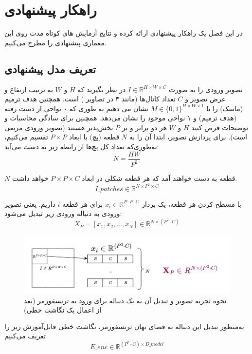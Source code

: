 
\chapter{راهکار پیشنهادی}

در این فصل یک راهکار پیشنهادی ارائه کرده و نتایج آزمایش های کوتاه مدت روی این معماری پیشنهادی را مطرح می‌کنیم.

\section{تعریف مدل پیشنهادی}

تصویر ورودی را به صورت $I \in \mathbb{R}^{H \times W \times C}$ در نظر بگیرید که $H$ و $W$ به ترتیب ارتفاع و عرض تصویر و $C$ تعداد کانال‌ها (مانند ۳ در تصاویر ) است. همچنین هدف ترمیم (ماسک) را با
$M \in \{0,1\}^{H \times W \times 1} $
نشان می دهیم به طوری که ۰ نواحی از دست رفته (هدف ترمیم) و ۱ نواحی موجود را نشان می‌دهد. همچنین برای سادگی محاسبات و توضیحات فرض کنید $H$ و‌ $W$ هر دو برابر و بر $P$ بخش‌پذیر هستند (تصویر ورودی مربعی است). برای پردازش تصویر، ابتدا آن را به $N$ قطعه (پچ) با ابعاد $P \times P$ تقسیم می‌کنیم، به‌طوری‌که تعداد کل پچ‌ها از رابطه زیر به دست می‌آید:
$$
N = \frac{HW}{P^2}
$$

$N$
قطعه به دست خواهند آمد که هر قطعه شکلی در ابعاد ${P \times P \times C}$ خواهد داشت.
$$
I\_{patches} \in \mathbb{R}^{N \times P^2 \times C}
$$

با مسطح کردن هر قطعه، یک بردار 
$x_i \in \mathbb{R}^{P \cdot P \cdot C}$
برای هر قطعه $i$ داریم. یعنی تصویر ورودی به دنباله ورودی زیر تبدیل می‌شود:
\[
X_P = [x_1, x_2, \dots, x_N] \in \mathbb{R}^{N \times (P^2 \cdot C)}
\]

\begin{figure}
	\centering
	\includegraphics[width=0.7\linewidth]{decompose}
	\caption{نحوه تجزیه تصویر و تبدیل آن به یک دنباله برای ورود به ترنسفورمر (بعد از اعمال یک نگاشت خطی)}
	\label{fig:decompose}
\end{figure}

به‌منظور تبدیل این دنباله به فضای نهان ترنسفورمر، نگاشت خطی قابل‌آموزش زیر را تعریف می‌کنیم
\begin{equation}
	E\_{enc} \in \mathbb{R}^{(P^2 \cdot C) \times D\_{model}}
\end{equation}

